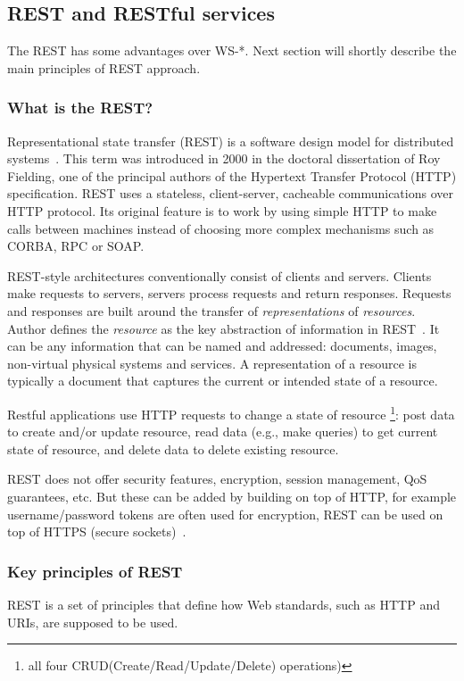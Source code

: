 \subsection{REST and RESTful services}
The REST has some advantages over WS-*. Next section will shortly
describe the main principles of REST approach. 

\subsubsection{What is the REST?}
Representational state transfer (REST) is a software design model for
distributed systems~\cite{Fielding2000}. This term was introduced in 2000 in the doctoral dissertation of
Roy Fielding, one of the principal authors of the Hypertext Transfer Protocol
(HTTP) specification.
REST uses a stateless, client-server, cacheable communications over HTTP protocol. Its original
feature is to work by using simple HTTP to make calls between machines instead
of choosing more complex mechanisms such as CORBA, RPC or SOAP.

REST-style architectures conventionally consist of clients and servers.
Clients make requests to servers, servers process requests and return responses.
Requests and responses are built around the transfer of \textit{representations}
of \textit{resources}.
Author defines the \textit{resource} as the key abstraction of information in
REST~\cite{Fielding2000}. It can be any information that can be named and
addressed: documents, images, non-virtual physical systems and services.
A representation of a resource is typically a document that captures the current or intended state of a resource.

Restful applications use HTTP requests to change a state of resource  \footnote{
all four CRUD(Create/Read/Update/Delete) operations)}: post data to create and/or update
resource, read data (e.g., make queries) to get current state of resource, and
delete data to delete existing resource.

REST does not offer security features, encryption, session management, QoS
guarantees, etc. But these can be added by building on top of HTTP, for example
username/password tokens are often used for encryption, REST can be used on
top of HTTPS (secure sockets)~\cite{ws_technologies_state_of_the_art}.

\subsubsection{Key principles of REST}
REST is a set of principles that define how Web standards, such as HTTP and
\gls{URI}s, are supposed to be used.

